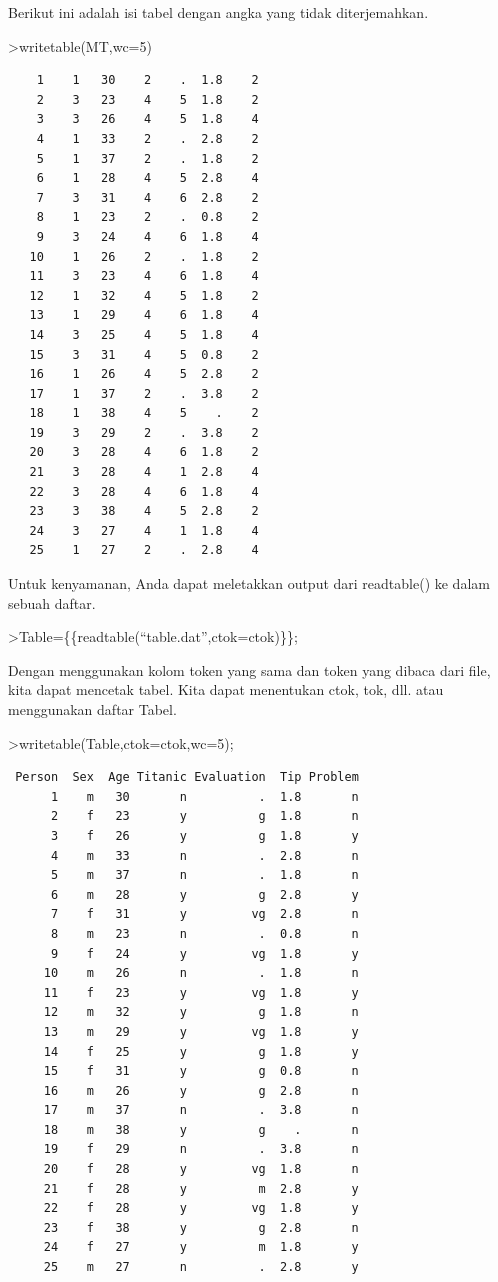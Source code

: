 \documentclass[
]{book}
\begin{document}
Berikut ini adalah isi tabel dengan angka yang tidak diterjemahkan.

\textgreater writetable(MT,wc=5)

\begin{verbatim}
    1    1   30    2    .  1.8    2
    2    3   23    4    5  1.8    2
    3    3   26    4    5  1.8    4
    4    1   33    2    .  2.8    2
    5    1   37    2    .  1.8    2
    6    1   28    4    5  2.8    4
    7    3   31    4    6  2.8    2
    8    1   23    2    .  0.8    2
    9    3   24    4    6  1.8    4
   10    1   26    2    .  1.8    2
   11    3   23    4    6  1.8    4
   12    1   32    4    5  1.8    2
   13    1   29    4    6  1.8    4
   14    3   25    4    5  1.8    4
   15    3   31    4    5  0.8    2
   16    1   26    4    5  2.8    2
   17    1   37    2    .  3.8    2
   18    1   38    4    5    .    2
   19    3   29    2    .  3.8    2
   20    3   28    4    6  1.8    2
   21    3   28    4    1  2.8    4
   22    3   28    4    6  1.8    4
   23    3   38    4    5  2.8    2
   24    3   27    4    1  1.8    4
   25    1   27    2    .  2.8    4
\end{verbatim}

Untuk kenyamanan, Anda dapat meletakkan output dari readtable() ke dalam sebuah daftar.

\textgreater Table=\{\{readtable(``table.dat'',ctok=ctok)\}\};

Dengan menggunakan kolom token yang sama dan token yang dibaca dari file, kita dapat mencetak tabel. Kita dapat menentukan ctok, tok, dll. atau menggunakan daftar Tabel.

\textgreater writetable(Table,ctok=ctok,wc=5);

\begin{verbatim}
 Person  Sex  Age Titanic Evaluation  Tip Problem
      1    m   30       n          .  1.8       n
      2    f   23       y          g  1.8       n
      3    f   26       y          g  1.8       y
      4    m   33       n          .  2.8       n
      5    m   37       n          .  1.8       n
      6    m   28       y          g  2.8       y
      7    f   31       y         vg  2.8       n
      8    m   23       n          .  0.8       n
      9    f   24       y         vg  1.8       y
     10    m   26       n          .  1.8       n
     11    f   23       y         vg  1.8       y
     12    m   32       y          g  1.8       n
     13    m   29       y         vg  1.8       y
     14    f   25       y          g  1.8       y
     15    f   31       y          g  0.8       n
     16    m   26       y          g  2.8       n
     17    m   37       n          .  3.8       n
     18    m   38       y          g    .       n
     19    f   29       n          .  3.8       n
     20    f   28       y         vg  1.8       n
     21    f   28       y          m  2.8       y
     22    f   28       y         vg  1.8       y
     23    f   38       y          g  2.8       n
     24    f   27       y          m  1.8       y
     25    m   27       n          .  2.8       y
\end{verbatim}
\end{document}
